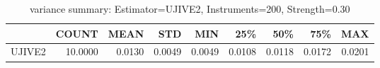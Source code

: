 \begin{table}[ht]
\centering
\caption{variance summary: Estimator=UJIVE2, Instruments=200, Strength=0.30}
\begin{tabular}{lrrrrrrrr}
\toprule
 & COUNT & MEAN & STD & MIN & 25\% & 50\% & 75\% & MAX \\
\midrule
UJIVE2 & 10.0000 & 0.0130 & 0.0049 & 0.0049 & 0.0108 & 0.0118 & 0.0172 & 0.0201 \\
\bottomrule
\end{tabular}
\end{table}
